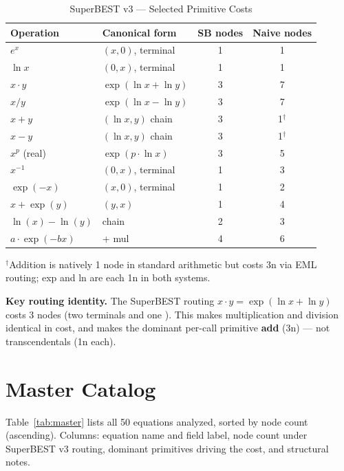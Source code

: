 \documentclass[12pt,a4paper]{article}
\theoremstyle{definition}
\newcommand{\EML}{\operatorname{EML}}
\newcommand{\EDL}{\operatorname{EDL}}
\newcommand{\EXL}{\operatorname{EXL}}
\newcommand{\EAL}{\operatorname{EAL}}
\newcommand{\DEML}{\operatorname{DEML}}
\begin{document}
\begin{table}[ht]
\centering
\caption{SuperBEST v3 --- Selected Primitive Costs}
\label{tab:routing}
\begin{tabular}{llcc}
\toprule
\textbf{Operation} & \textbf{Canonical form} & \textbf{SB nodes} & \textbf{Naive nodes} \\
\midrule
$e^x$                & \EML$(x,0)$, terminal & 1 & 1 \\
$\ln x$              & \EXL$(0,x)$, terminal & 1 & 1 \\
$x \cdot y$          & $\exp(\ln x + \ln y)$ & 3 & 7 \\
$x / y$              & $\exp(\ln x - \ln y)$ & 3 & 7 \\
$x + y$              & \EAL$(\ln x, y)$ chain & 3 & 1$^\dagger$ \\
$x - y$              & \EML$(\ln x, y)$ chain & 3 & 1$^\dagger$ \\
$x^p$ (real)         & $\exp(p \cdot \ln x)$ & 3 & 5 \\
$x^{-1}$             & \EDL$(0,x)$, terminal & 1 & 3 \\
$\exp(-x)$           & \DEML$(x,0)$, terminal & 1 & 2 \\
$x + \exp(y)$        & \EAL$(y, x)$ & 1 & 4 \\
$\ln(x) - \ln(y)$    & \EXL chain & 2 & 3 \\
$a \cdot \exp(-bx)$  & \DEML + mul & 4 & 6 \\
\bottomrule
\end{tabular}
\vspace{4pt}
\small $^\dagger$Addition is natively 1 node in standard arithmetic but costs 3n via
EML routing; exp and ln are each 1n in both systems.
\end{table}

\noindent
\textbf{Key routing identity.}  The SuperBEST routing $x \cdot y =
\exp(\ln x + \ln y)$ costs 3 nodes (two \EXL terminals and one \EML).  This
makes multiplication and division identical in cost, and makes the dominant
per-call primitive \textbf{add} (3n) --- not transcendentals (1n each).

\section{Master Catalog}
\label{sec:catalog}

Table~\ref{tab:master} lists all 50 equations analyzed, sorted by node count
(ascending).  Columns: equation name and field label, node count under
SuperBEST v3 routing, dominant primitives driving the cost, and structural
notes.
\end{document}
